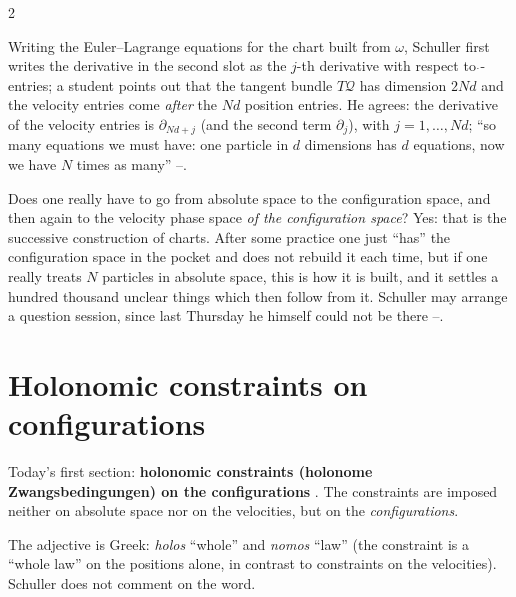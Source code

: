 \begin{paracol}{2}
\begin{coursenote}\label{cn:zw-index}
Writing the Euler--Lagrange equations for the chart built from $\omega$, Schuller first writes the derivative in the second slot as the $j$-th derivative with respect to $\dot{}$-entries; a student points out that the tangent bundle $T\mathcal Q$ has dimension $2Nd$ and the velocity entries come \emph{after} the $Nd$ position entries. He agrees: the derivative of the velocity entries is $\partial_{Nd+j}$ (and the second term $\partial_j$), with $j=1,\dots,Nd$; ``so many equations we must have: one particle in $d$ dimensions has $d$ equations, now we have $N$ times as many'' --.
\end{coursenote}

Does one really have to go from absolute space to the configuration space, and then again to the velocity phase space \emph{of the configuration space}? Yes: that is the successive construction of charts. After some practice one just ``has'' the configuration space in the pocket and does not rebuild it each time, but if one really treats $N$ particles in absolute space, this is how it is built, and it settles a hundred thousand unclear things which then follow from it. Schuller may arrange a question session, since last Thursday he himself could not be there --.

\section{Holonomic constraints on configurations}\label{sec:zw-holo}

Today's first section: \textbf{holonomic constraints (holonome Zwangsbedingungen) on the configurations} . The constraints are imposed neither on absolute space nor on the velocities, but on the \emph{configurations}.

\begin{coursenote}\label{cn:zw-holonomic}
The adjective is Greek: \emph{holos} ``whole'' and \emph{nomos} ``law'' (the constraint is a ``whole law'' on the positions alone, in contrast to constraints on the velocities). Schuller does not comment on the word.
\end{coursenote}


\end{paracol}
